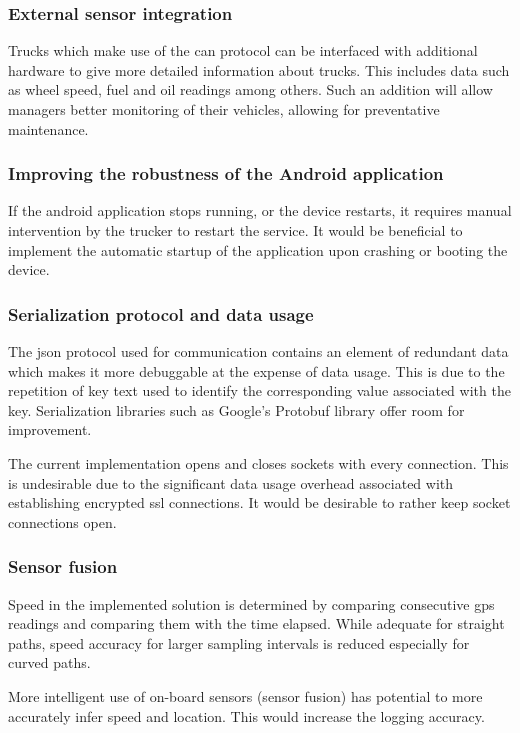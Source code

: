 \subsubsection{External sensor integration}
Trucks which make use of the \ac{can} protocol can be interfaced with additional hardware to give more detailed information about trucks.
This includes data such as wheel speed, fuel and oil readings among others.
Such an addition will allow managers better monitoring of their vehicles, allowing for preventative maintenance.

\subsubsection{Improving the robustness of the Android application}
If the android application stops running, or the device restarts, it requires manual intervention by the trucker to restart the service.
It would be beneficial to implement the automatic startup of the application upon crashing or booting the device.

\subsubsection{Serialization protocol and data usage}
The \ac{json} protocol used for communication contains an element of redundant data which makes it more debuggable at the expense of data usage.
This is due to the repetition of key text used to identify the corresponding value associated with the key.
Serialization libraries such as Google's Protobuf library offer room for improvement.

The current implementation opens and closes sockets with every connection.
This is undesirable due to the significant data usage overhead associated with establishing encrypted \ac{ssl} connections.
It would be desirable to rather keep socket connections open.

\subsubsection{Sensor fusion}
Speed in the implemented solution is determined by comparing consecutive \ac{gps} readings and comparing them with the time elapsed.
While adequate for straight paths, speed accuracy for larger sampling intervals is reduced especially for curved paths.

More intelligent use of on-board sensors (sensor fusion) has potential to more accurately infer speed and location.
This would increase the logging accuracy.

